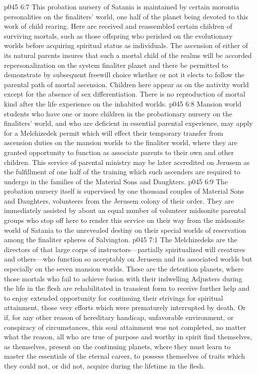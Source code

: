 \pc \vs p045 6:7 This probation nursery of Satania is maintained by certain morontia personalities on the finaliters’ world, one half of the planet being devoted to this work of child rearing. Here are received and reassembled certain children of surviving mortals, such as those offspring who perished on the evolutionary worlds before acquiring spiritual status as individuals. The ascension of either of its natural parents insures that such a mortal child of the realms will be accorded repersonalization on the system finaliter planet and there be permitted to demonstrate by subsequent freewill choice whether or not it elects to follow the parental path of mortal ascension. Children here appear as on the nativity world except for the absence of sex differentiation. There is no reproduction of mortal kind after the life experience on the inhabited worlds.
\vs p045 6:8 Mansion world students who have one or more children in the probationary nursery on the finaliters’ world, and who are deficient in essential parental experience, may apply for a Melchizedek permit which will effect their temporary transfer from ascension duties on the mansion worlds to the finaliter world, where they are granted opportunity to function as associate parents to their own and other children. This service of parental ministry may be later accredited on Jerusem as the fulfillment of one half of the training which such ascenders are required to undergo in the families of the Material Sons and Daughters.
\vs p045 6:9 The probation nursery itself is supervised by one thousand couples of Material Sons and Daughters, volunteers from the Jerusem colony of their order. They are immediately assisted by about an equal number of volunteer midsonite parental groups who stop off here to render this service on their way from the midsonite world of Satania to the unrevealed destiny on their special worlds of reservation among the finaliter spheres of Salvington.
\vs p045 7:1 The Melchizedeks are the directors of that large corps of instructors---partially spiritualized will creatures and others---who function so acceptably on Jerusem and its associated worlds but especially on the seven mansion worlds. These are the detention planets, where those mortals who fail to achieve fusion with their indwelling Adjusters during the life in the flesh are rehabilitated in transient form to receive further help and to enjoy extended opportunity for continuing their strivings for spiritual attainment, those very efforts which were prematurely interrupted by death. Or if, for any other reason of hereditary handicap, unfavorable environment, or conspiracy of circumstances, this soul attainment was not completed, no matter what the reason, all who are true of purpose and worthy in spirit find themselves, as themselves, present on the continuing planets, where they must learn to master the essentials of the eternal career, to possess themselves of traits which they could not, or did not, acquire during the lifetime in the flesh.
